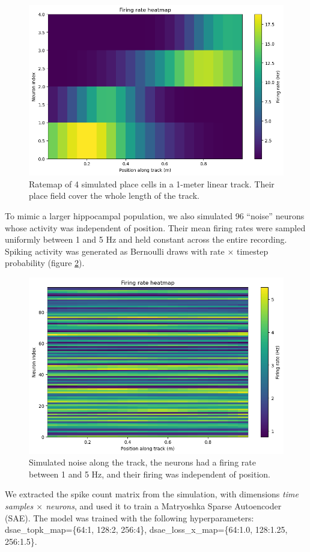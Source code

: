 \begin{figure}
    \centering
    \includegraphics[width=0.75\linewidth]{figures/place_cells_ratemap.png}
    \caption{Ratemap of 4 simulated place cells in a 1-meter linear track. Their place field cover the whole length of the track. }
    \label{figure:ratemap_placeCells}
\end{figure}

To mimic a larger hippocampal population, we also simulated 96 “noise” neurons whose activity was independent of position. Their mean firing rates were sampled uniformly between 1 and 5 Hz and held constant across the entire recording. Spiking activity was generated as Bernoulli draws with rate $\times$ timestep probability (figure \ref{figure:ratemap_noise}). 

\begin{figure}
    \centering
    \includegraphics[width=0.75\linewidth]{figures/noise_ratemap.png}
    \caption{Simulated noise along the track, the neurons had a firing rate between 1 and 5 Hz, and their firing was independent of position.}
    \label{figure:ratemap_noise}
\end{figure}

We extracted the spike count matrix from the simulation, with dimensions \textit{time samples $\times$ neurons}, and used it to train a Matryoshka Sparse Autoencoder (SAE). The model was trained with the following hyperparameters: dsae\_topk\_map=\{64:1, 128:2, 256:4\}, dsae\_loss\_x\_map=\{64:1.0, 128:1.25, 256:1.5\}.

